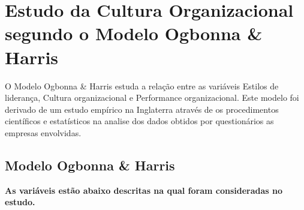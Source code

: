 {





\newpage
\section{Estudo da Cultura Organizacional segundo o Modelo Ogbonna \& Harris}
\qquad O Modelo Ogbonna \& Harris estuda a relação entre as variáveis Estilos de liderança, Cultura organizacional e Performance organizacional. Este modelo foi derivado de um estudo empírico na Inglaterra através de os procedimentos científicos e estatísticos na analise dos dados obtidos por questionários as empresas envolvidas.\\

\subsection{Modelo Ogbonna \& Harris}
{\bf As variáveis estão abaixo descritas na qual foram consideradas no estudo.} \\

}
